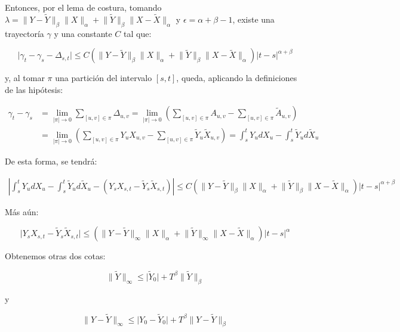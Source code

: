 Entonces, por el lema de costura, tomando $\lambda = \lVert Y - \tilde{Y} \rVert_{\beta} \rVert X \lVert_{\alpha} + \lVert \tilde{Y} \rVert_{\beta} \lVert X - \tilde{X} \rVert_{\alpha}$ y $\epsilon = \alpha + \beta - 1$, existe una trayectoría $\gamma$ y una constante $C$ tal que:

\[
	\lvert \gamma_t - \gamma_s - \Delta_{s,t} \rvert \leq C \left( \lVert Y - \tilde{Y} \rVert_{\beta} \rVert X \lVert_{\alpha} + \lVert \tilde{Y} \rVert_{\beta} \lVert X - \tilde{X} \rVert_{\alpha}  \right) \lvert t - s \rvert^{\alpha + \beta}
\]

y, al tomar $\pi$ una partición del intervalo $[s,t]$, queda, aplicando la definiciones de las hipótesis:

\begin{align*}
	\gamma_t - \gamma_s &= \lim_{\lvert \pi \rvert \rightarrow 0} \sum_{ [u,v] \in \pi } \Delta_{u,v} = \lim_{ \lvert \pi \rvert \rightarrow 0 } \left(  \sum_{ [u,v]\in \pi } A_{u,v} - \sum_{ [u,v] \in \pi } \tilde{A}_{u,v} \right) \\
	&= \lim_{ \lvert \pi \rvert \rightarrow 0 } \left(  \sum_{ [u,v]\in \pi } Y_u X_{u,v} - \sum_{ [u,v] \in \pi } \tilde{Y}_u \tilde{X}_{u,v} \right) = \int_s^t Y_u dX_u - \int_s^t \tilde{Y}_u d\tilde{X}_u
\end{align*}

De esta forma, se tendrá:

\begin{align*}
	\left\lvert \int_s^t Y_u dX_u - \int_s^t \tilde{Y}_u d\tilde{X}_u - (Y_s X_{s,t} - \tilde{Y}_s \tilde{X}_{s,t}) \right\rvert \leq C \left( \lVert Y - \tilde{Y} \rVert_{\beta} \rVert X \lVert_{\alpha} + \lVert \tilde{Y} \rVert_{\beta} \lVert X - \tilde{X} \rVert_{\alpha}  \right) \lvert t - s \rvert^{\alpha + \beta}
\end{align*}

Más aún:

\[
	\lvert Y_s X_{s,t} - \tilde{Y}_s \tilde{X}_{s,t} \rvert \leq \left( \lVert Y - \tilde{Y} \rVert_{\infty} \rVert X \lVert_{\alpha} + \lVert \tilde{Y} \rVert_{\infty} \lVert X - \tilde{X} \rVert_{\alpha}  \right) \lvert t - s \rvert^{\alpha}
\]

Obtenemos otras dos cotas:

\[
	\lVert \tilde{Y} \rVert_{\infty} \leq \lvert \tilde{Y}_0 \rvert + T^{\beta} \lVert \tilde{Y} \rVert_{\beta}
\]

y

\[
	\lVert Y - \tilde{Y} \rVert_{\infty} \leq \lvert  Y_0 - \tilde{Y}_0 \rvert + T^{\beta} \lVert Y - \tilde{Y} \rVert_{\beta}
\]

